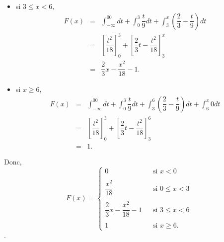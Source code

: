 \begin{questions}
\begin{parts}
\begin{solution}
\begin{itemize}
      \item[$\bullet$] si $3 \leq x < 6,$ \begin{eqnarray*}
                                            F(x)    &=&  \int_{-\infty}^00dt + \int_0^3 \dfrac{t}{9}dt + \int_3^x\left(\dfrac{2}{3}-\dfrac{t}{9}\right)dt\\
                                                    &=&  \left[\dfrac{t^2}{18}\right]_0^3 + \left[\dfrac{2}{3}t -\dfrac{t^2}{18}\right]_3^x\\
                                                    &=&  \dfrac{2}{3}x -\dfrac{x^2}{18} -1.
                                   \end{eqnarray*}



      \item[$\bullet$]  si $x \geq 6,$ \begin{eqnarray*}
                                      F(x)      &=&  \int_{-\infty}^00dt + \int_0^3 \dfrac{t}{9}dt + \int_3^6\left(\dfrac{2}{3}-\dfrac{t}{9}\right)dt +\int_6^x0dt\\
                                                &=&  \left[\dfrac{t^2}{18}\right]_0^3 + \left[\dfrac{2}{3}t -\dfrac{t^2}{18}\right]_3^6\\
                                                &=& 1 .
                                   \end{eqnarray*}
    \end{itemize}
   Donc, $$F(x) = \left \{
                \begin{array}{lcl}
                        0                                   & &\text{si } x < 0 \\
                                                            & & \\
                        \dfrac{x^2}{18}                     & &\text{si } 0 \leq x < 3   \\
                                                            & & \\
                        \dfrac{2}{3}x-\dfrac{x^2}{18}-1     & &\text{si } 3 \leq x < 6 \\
                                                            & & \\
                        1                                   & &\text{si } x \geq 6.
                \end{array}
                    \right.$$.
\end{solution}




\end{parts}
\end{questions}
